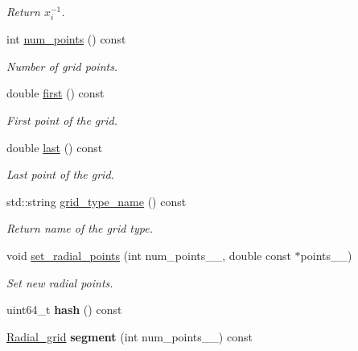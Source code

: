 \begin{DoxyCompactItemize}
\begin{DoxyCompactList}\small\item\em Return $ x_{i}^{-1} $. \end{DoxyCompactList}\item 
int \hyperlink{classsirius_1_1_radial__grid_ae4775a4fff1a0852d934684d1939a824}{num\+\_\+points} () const 
\begin{DoxyCompactList}\small\item\em Number of grid points. \end{DoxyCompactList}\item 
double \hyperlink{classsirius_1_1_radial__grid_a1eb178aac1d9d8f898d4d6a5e1d3b516}{first} () const 
\begin{DoxyCompactList}\small\item\em First point of the grid. \end{DoxyCompactList}\item 
double \hyperlink{classsirius_1_1_radial__grid_a70ac75d37d84830d7157b5d00bf3e852}{last} () const 
\begin{DoxyCompactList}\small\item\em Last point of the grid. \end{DoxyCompactList}\item 
std\+::string \hyperlink{classsirius_1_1_radial__grid_a4dc44821cca604d6bc6eadd4075fcda9}{grid\+\_\+type\+\_\+name} () const 
\begin{DoxyCompactList}\small\item\em Return name of the grid type. \end{DoxyCompactList}\item 
void \hyperlink{classsirius_1_1_radial__grid_affbaba8bbac301aa3908be8e11a99bdf}{set\+\_\+radial\+\_\+points} (int num\+\_\+points\+\_\+\+\_\+, double const $\ast$points\+\_\+\+\_\+)
\begin{DoxyCompactList}\small\item\em Set new radial points. \end{DoxyCompactList}\item 
\hypertarget{classsirius_1_1_radial__grid_a13d9002520bbb87a4ad16c695d231e36}{}uint64\+\_\+t {\bfseries hash} () const \label{classsirius_1_1_radial__grid_a13d9002520bbb87a4ad16c695d231e36}

\item 
\hypertarget{classsirius_1_1_radial__grid_a5bddf2f068d7f68a7092fb5ac8be2343}{}\hyperlink{classsirius_1_1_radial__grid}{Radial\+\_\+grid} {\bfseries segment} (int num\+\_\+points\+\_\+\+\_\+) const \label{classsirius_1_1_radial__grid_a5bddf2f068d7f68a7092fb5ac8be2343}


\end{DoxyCompactItemize}
